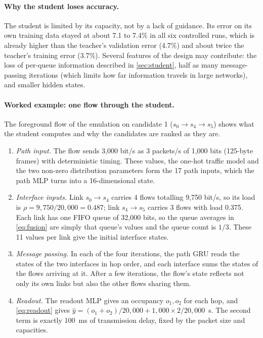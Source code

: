 \paragraph{Why the student loses accuracy.} The student is limited by its capacity, not by a lack of guidance. Its error on its own training data stayed at about 7.1 to 7.4\% in all six controlled runs, which is already higher than the teacher's validation error (4.7\%) and about twice the teacher's training error (3.7\%). Several features of the design may contribute: the loss of per-queue information described in \cref{sec:student}, half as many message-passing iterations (which limits how far information travels in large networks), and smaller hidden states.

\paragraph{Worked example: one flow through the student.} The foreground flow of the emulation on candidate 1 ($s_0 \to s_4 \to s_5$) shows what the student computes and why the candidates are ranked as they are.
\begin{enumerate}
  \item \emph{Path input.} The flow sends 3,000 bit/s as 3 packets/s of 1,000 bits (125-byte frames) with deterministic timing. These values, the one-hot traffic model and the two non-zero distribution parameters form the 17 path inputs, which the path MLP turns into a 16-dimensional state.
  \item \emph{Interface inputs.} Link $s_0 \to s_4$ carries 4 flows totalling 9,750 bit/s, so its load is $\rho = 9{,}750/20{,}000 = 0.487$; link $s_4 \to s_5$ carries 3 flows with load 0.375. Each link has one FIFO queue of 32,000 bits, so the queue averages in \cref{eq:fusion} are simply that queue's values and the queue count is $1/3$. These 11 values per link give the initial interface states.
  \item \emph{Message passing.} In each of the four iterations, the path GRU reads the states of the two interfaces in hop order, and each interface sums the states of the flows arriving at it. After a few iterations, the flow's state reflects not only its own links but also the other flows sharing them.
  \item \emph{Readout.} The readout MLP gives an occupancy $o_1, o_2$ for each hop, and \cref{eq:readout} gives
  $\hat{y} = (o_1 + o_2)/20{,}000 + 1{,}000 \times 2/20{,}000$~s. The second term is exactly 100~ms of transmission delay, fixed by the packet size and capacities.
\end{enumerate}
